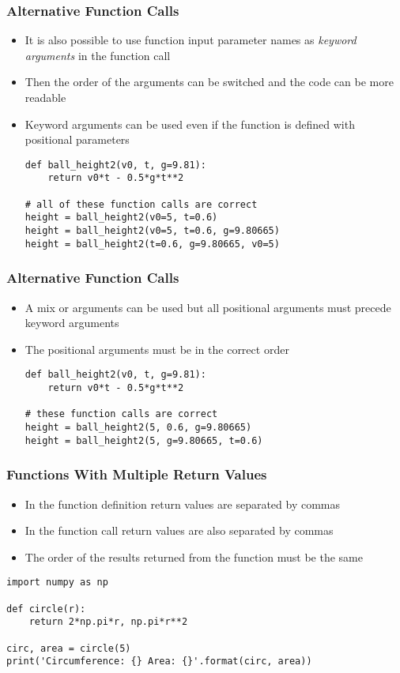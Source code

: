 \documentclass[english,14pt]{beamer}
\begin{document}
\begin{frame}[fragile]
\frametitle{Alternative Function Calls}
\begin{itemize}
\item It is also possible to use function input parameter names as \textit{keyword arguments} in the function call
\item Then the order of the arguments can be switched and the code can be more readable
\item Keyword arguments can be used even if the function is defined with positional parameters
\begin{lstlisting}[style=CStyle]
def ball_height2(v0, t, g=9.81):    
    return v0*t - 0.5*g*t**2      

# all of these function calls are correct
height = ball_height2(v0=5, t=0.6)   
height = ball_height2(v0=5, t=0.6, g=9.80665)  
height = ball_height2(t=0.6, g=9.80665, v0=5) 
\end{lstlisting}
\end{itemize}
\end{frame}


\begin{frame}[fragile]
\frametitle{Alternative Function Calls}
\begin{itemize}
\item A mix or arguments can be used but all positional arguments must precede keyword arguments
\item The positional arguments must be in the correct order
\begin{lstlisting}[style=CStyle]
def ball_height2(v0, t, g=9.81):    
    return v0*t - 0.5*g*t**2     
    
# these function calls are correct
height = ball_height2(5, 0.6, g=9.80665)   
height = ball_height2(5, g=9.80665, t=0.6)  
\end{lstlisting}
\end{itemize}
\end{frame}




\begin{frame}[fragile]
\frametitle{Functions With Multiple Return Values}
\begin{itemize}
\item In the function definition return values are separated by commas 
\item In the function call return values are also separated by commas
\item The order of the results returned from the function must be the same
\end{itemize}
\begin{lstlisting}[style=CStyle]
import numpy as np

def circle(r):
    return 2*np.pi*r, np.pi*r**2

circ, area = circle(5)
print('Circumference: {} Area: {}'.format(circ, area)) 
\end{lstlisting}
\end{frame}
\end{document}
